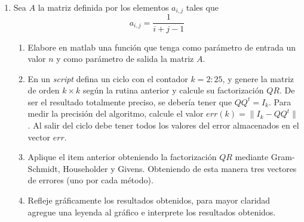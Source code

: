 \documentclass[12pt]{article}
\begin{document}
\begin{enumerate}
$$\begin{array}{c}
                                 0\\
                                 \vdots\\
                                 0\\
                                 v_{N}
                              \end{array}\right)
$$
donde $v_0$ y $v_N$ son definidos en el problema. Sea $n=N-1$ el \'umero de inc\'ognitas en el 
sistema lineal
\begin{enumerate}
   \item Resolver este sistema usando la descomposici\'on $LU$ y Sustituci\'on progresiva y 
regresiva con $n=10, 100, 200, 400,800$. Determine el cantidad de tiempo computacional requerido 
para cada $n$ (Use {\tt tic} y {\tt toc} para este prop\'osito y {\tt format long} para ver la 
cantidad de d\'igitos suficientes). Compare los resultados en cada paso con la soluci\'on exacta en 
la misma gr\'afica tanto para $n=10$ y $n=400$. Explique que observa.

\item  Resolver este sistema usando la descomposici\'on $LU$ para sistemas tridiagonales con $n=10, 
100, 200, 400, 800$. Determine el cantidad de tiempo computacional requerido 
para cada $n$. Compare los resultados en cada paso con la soluci\'on exacta en 
la misma gr\'afica tanto para $n=10$ y $n=400$.

\item Compare los resultados obtenidos en los dos items anteriores. ?`C\'ual algoritmo provee una 
soluci\'on del sistema m\'as r\'apido?. Muestre una tabla comparativa de los tiempos de ejecuci\'on 
para cada valor de $n$. Los resultados coinciden con la complejidad computacional de cada 
algoritmo? 
\end{enumerate}
\item Sea $A$ la matriz definida por los elementos $a_{i,j}$ tales que
$$
a_{i,j} = \frac{1}{i+j-1}
$$

\begin{enumerate}
 \item Elabore en matlab una funci\'on que tenga como par\'ametro de entrada un valor $n$ y como par\'ametro de salida la matriz $A$.
 \item En un \textit{script} defina un ciclo con el contador $k = 2 : 25$, y genere la matriz de orden $k \times k$ seg\'un la rutina
anterior y calcule su factorizaci\'on $QR$. De ser el resultado totalmente preciso, se deber\'ia tener que $QQ^t =I_k$. Para medir
la precisi\'on del algoritmo, calcule el valor $err(k)= \|I_k - QQ^t \|$. Al salir del ciclo debe tener todos los valores del error
almacenados en el vector $err$.
\item Aplique el item anterior obteniendo la factorizaci\'on $QR$ mediante Gram-Schmidt, Householder y Givens. Obteniendo de esta manera
tres vectores de errores (uno por cada m\'etodo).
\item Refleje gr\'aficamente los resultados obtenidos, para mayor claridad agregue una leyenda al gr\'afico e interprete los resultados
obtenidos.
\end{enumerate}

\end{enumerate}
\end{document}
